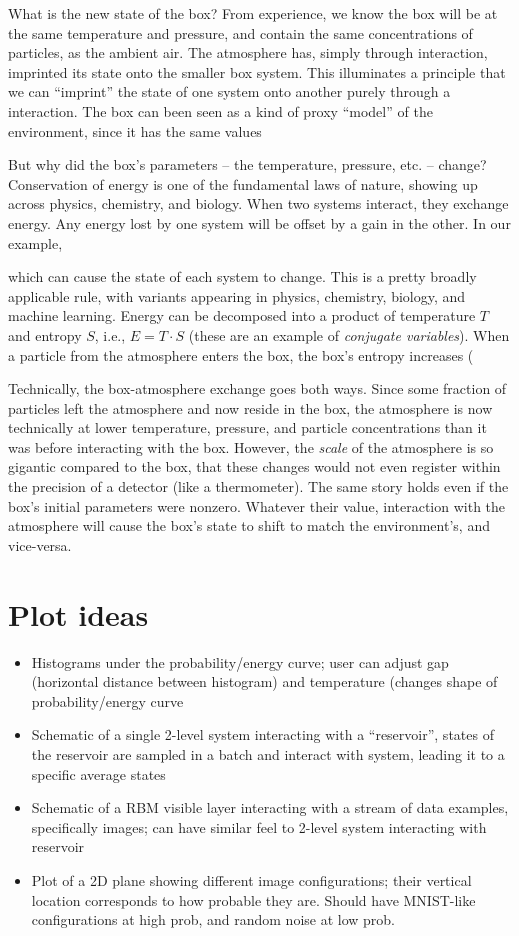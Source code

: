 \documentclass[a4paper]{article}
\begin{document}
What is the new state of the box? From experience, we know the box will be at the same temperature and pressure, and contain the same concentrations of particles, as the ambient air. The atmosphere has, simply through interaction, imprinted its state onto the smaller box system. 
This illuminates a principle that we can ``imprint'' the state of one system onto another purely through a interaction. The box can been seen as a kind of proxy ``model'' of the environment, since it has the same values 

But why did the box's parameters -- the temperature, pressure, etc. -- change? Conservation of energy is one of the fundamental laws of nature, showing up across physics, chemistry, and biology. When two systems interact, they exchange energy. Any energy lost by one system will be offset by a gain in the other. In our example, 


which can cause the state of each system to change. This is a pretty broadly applicable rule, with variants appearing in physics, chemistry, biology, and machine learning.
Energy can be decomposed into a product of temperature $T$ and entropy $S$, i.e., $E = T\cdot S$ (these are an example of \emph{conjugate variables}). When a particle from the atmosphere enters the box, the box's entropy increases (



Technically, the box-atmosphere exchange goes both ways. Since some fraction of particles left the atmosphere and now reside in the box, the atmosphere is now technically at lower temperature, pressure, and particle concentrations than it was before interacting with the box. However, the \emph{scale} of the atmosphere is so gigantic compared to the box, that these changes would not even register within the precision of a detector (like a thermometer). The same story holds even if the box's initial parameters were nonzero. Whatever their value, interaction with the atmosphere will cause the box's state to shift to match the environment's, and vice-versa. 




\section{Plot ideas}
\begin{itemize}
 \item Histograms under the probability/energy curve; user can adjust gap (horizontal distance between histogram) and temperature (changes shape of probability/energy curve
 \item Schematic of a single 2-level system interacting with a ``reservoir'', states of the reservoir are sampled in a batch and interact with system, leading it to a specific average states
 \item Schematic of a RBM visible layer interacting with a stream of data examples, specifically images; can have similar feel to 2-level system interacting with reservoir
 \item Plot of a 2D plane showing different image configurations; their vertical location corresponds to how probable they are. Should have MNIST-like configurations at high prob, and random noise at low prob.
\end{itemize}
\end{document}
